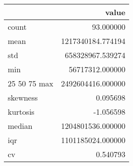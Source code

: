 \begin{tabular}{lr}
\toprule
 & value \\
\midrule
count & 93.000000 \\
mean & 1217340184.774194 \\
std & 658328967.539274 \\
min & 56717312.000000 \\
25%
50%
75%
max & 2492604416.000000 \\
skewness & 0.095698 \\
kurtosis & -1.056598 \\
median & 1204801536.000000 \\
iqr & 1101185024.000000 \\
cv & 0.540793 \\
\bottomrule
\end{tabular}
